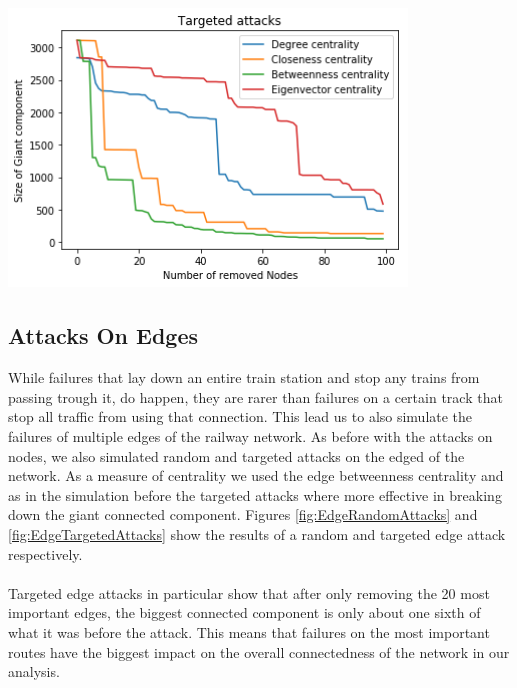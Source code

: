 \documentclass{Resources/netsci-project}
\begin{document}
\begin{center}
    \centering
    \includegraphics[width=300pt]{Resources/node_targeted_attacks}
    \label{fig:NodeTargetedAttacks}
\end{center}

\subsection{Attacks On Edges}
While failures that lay down an entire train station and stop any trains from passing trough it, do happen, they are rarer than failures on a certain track that stop all traffic from using that connection. This lead us to also simulate the failures of multiple edges of the railway network. As before with the attacks on nodes, we also simulated random and targeted attacks on the edged of the network. As a measure of centrality we used the edge betweenness centrality and as in the simulation before the targeted attacks where more effective in breaking down the giant connected component. Figures \ref{fig:EdgeRandomAttacks} and \ref{fig:EdgeTargetedAttacks} show the results of a random and targeted edge attack respectively.
\\~\\
Targeted edge attacks in particular show that after only removing the 20 most important edges, the biggest connected component is only about one sixth of what it was before the attack. This means that failures on the most important routes have the biggest impact on the overall connectedness of the network in our analysis.
\end{document}

